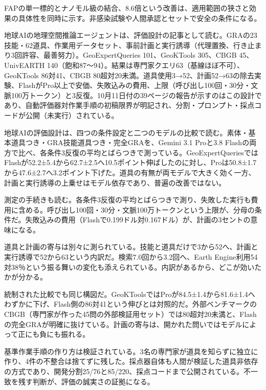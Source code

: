 \documentclass[lualatex,a4paper,10pt]{jlreq}
\begin{document}
FAPの単一標的とナノモル級の結合、8.6倍という改善は、適用範囲の狭さと効果の具体性を同時に示す。非感染試験や人間承認とセットで安全の条件になる。
\cite{B46,B83,B44,B43,B45}


地球AIの地理空間推論エージェントは、評価設計の記事として読む。GRAの23技能・62道具、作業用データセット、事前計画と実行誘導（代理置換、行き止まり3回許容、最善努力）。GeoExpertQueries 101、GeoKTools 305、CBGB 45、UnivEARTH 140（飽和87〜94）。結果は専門家クエリ63（基線ほぼ不可）、GeoKTools 86対41、CBGB 80超対20未満。道具使用3→52、計画52→63の除去実験、FlashがPro以上で安価、失敗込みの費用、上限（呼び出し100回・30分・文脈100万トークン）と3反復。10月11日付の39ページの報告が示すのはこの設計であり、自動評価器対作業手順の初稿限界が明記され、分割・プロンプト・採点コードが公開（未実行）されている。
\cite{B47,B84,B48}


地球AIの評価設計は、四つの条件設定と二つのモデルの比較で読む。素体・基本道具つき・GRA技能道具つき・完全GRAを、Gemini 3.1 Proと3.8 Flashの両方で比べ、各条件3反復の平均とばらつきで測っている。GeoExpertQueriesではFlashが52.2±5.4から62.7±2.5へ10.5ポイント伸ばしたのに対し、Proは50.8±1.7から47.6±2.7へ3.2ポイント下げた。道具の有無が両モデルで大きく効く一方、計画と実行誘導の上乗せはモデル依存であり、普遍の改善ではない。
\cite{B47,B84,B48}


測定の手続きも読む。各条件3反復の平均とばらつきで測り、失敗した実行も費用に含める。呼び出し100回・30分・文脈100万トークンという上限が、分母の条件だ。失敗込みの費用（Flashで0.199ドル対0.167ドル）が、計画の3セントの意味になる。
\cite{B47,B84,B48}


道具と計画の寄与は別々に測られている。技能と道具だけで3から52へ、計画と実行誘導で52から63という内訳だ。検索7.0回から3.2回へ、Earth Engine利用54対38％という振る舞いの変化も添えられている。内訳があるから、どこが効いたかが分かる。
\cite{B47,B84,B48}


統制された比較でも同じ構図だ。GeoKToolsではProが84.5±1.4から81.6±1.4へわずかに下げ、Flash側の86対41という伸びとは対照的だ。外部ベンチマークのCBGB（専門家が作った45問の外部検証用セット）では80超対20未満と、Flashの完全GRAが明確に抜けている。計画の寄与は、開かれた問いではモデルによって正にも負にも振れる。
\cite{B47,B84,B48}


基準作業手順の作り方は検証されている。3名の専門家が道具を知らずに独立に作り、4件の不整合は捨てずに残した。採点器自体も人間が検証した道具非依存の方式であり、開発分割25/76と85/220、採点コードまで公開されている。不一致を残す判断が、評価の誠実さの証拠になる。
\cite{B47,B84,B48}
\end{document}
